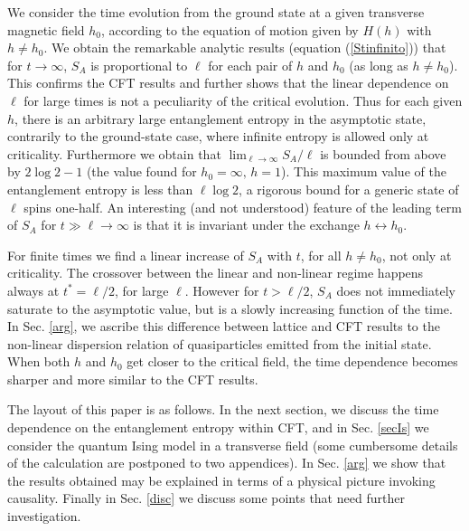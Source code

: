 \documentclass[12pt,preprint,tighten,eqsecnum,aps,floats,psfig,epsfig,amsmath,onecolumn]{revtex4-1}
\begin{document}
We consider the time evolution from the ground state at a given transverse 
magnetic field $h_0$, according to the equation of motion given by 
$H(h)$ with $h\neq h_0$.
We obtain the remarkable analytic results (equation (\ref{Stinfinito})) that 
for $t\rightarrow\infty$, $S_A$ is proportional to $\ell$ for each pair 
of $h$ and $h_0$ (as long as $h\neq h_0$).
This confirms the CFT results and further shows that the linear 
dependence on $\ell$ for large times is not a peculiarity of the critical 
evolution. 
Thus for each given $h$, there is an arbitrary large entanglement entropy 
in the asymptotic state, contrarily to the ground-state case, where infinite 
entropy is allowed only at criticality.
Furthermore we obtain that $\lim_{\ell\rightarrow\infty} S_A/\ell$ 
is bounded from 
above by $2\log 2-1$ (the value found for $h_0=\infty,\,h=1$). 
This maximum value of the entanglement entropy is less than $\ell \log 2$,  
a rigorous bound for a generic state of $\ell$ spins one-half.
An interesting (and not understood) feature of the leading term of $S_A$ for 
$t\gg \ell\rightarrow\infty$ is that it is invariant under the exchange 
$h\leftrightarrow h_0$.

For finite times we find a linear increase of $S_A$ with $t$,
for all $h\neq h_0$, not only at criticality. 
The crossover between the linear and non-linear regime happens always at 
$t^*=\ell/2$, for large $\ell$.
However for $t>\ell/2$, $S_A$ does not immediately saturate to the 
asymptotic value, but is a slowly increasing function of the time.
In Sec. \ref{arg}, we ascribe this difference between lattice and CFT
results to the non-linear dispersion relation of quasiparticles emitted 
from the initial state. 
When both $h$ and $h_0$ get closer to the critical field,
the time dependence becomes sharper and more similar to the CFT results.


The layout of this paper is as follows. In the next section, we discuss the 
time dependence on the entanglement entropy within CFT, and in 
Sec. \ref{secIs} we consider the quantum Ising model in a transverse 
field (some cumbersome details of the calculation are postponed to 
two appendices).
In Sec. \ref{arg} we show that the results obtained may be explained in terms
of a physical picture invoking causality. 
Finally in Sec. \ref{disc} we discuss some points that 
need further investigation.
\end{document}
